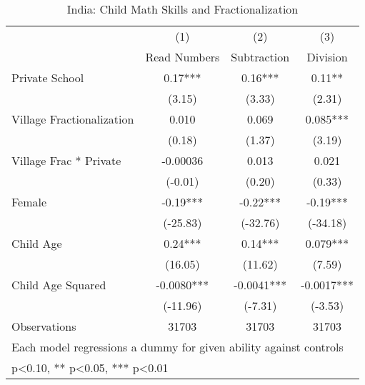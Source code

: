 \begin{table}[htbp]\centering
\def\sym#1{\ifmmode^{#1}\else\(^{#1}\)\fi}
\caption{India: Child Math Skills and Fractionalization\label{indiamath}}
\begin{tabular}{l*{3}{c}}
\toprule
                &\multicolumn{1}{c}{(1)}&\multicolumn{1}{c}{(2)}&\multicolumn{1}{c}{(3)}\\
                &\multicolumn{1}{c}{Read Numbers}&\multicolumn{1}{c}{Subtraction}&\multicolumn{1}{c}{Division}\\
\midrule
Private School  &     0.17***&     0.16***&     0.11** \\
                &   (3.15)   &   (3.33)   &   (2.31)   \\
Village Fractionalization&    0.010   &    0.069   &    0.085***\\
                &   (0.18)   &   (1.37)   &   (3.19)   \\
Village Frac * Private& -0.00036   &    0.013   &    0.021   \\
                &  (-0.01)   &   (0.20)   &   (0.33)   \\
Female          &    -0.19***&    -0.22***&    -0.19***\\
                & (-25.83)   & (-32.76)   & (-34.18)   \\
Child Age       &     0.24***&     0.14***&    0.079***\\
                &  (16.05)   &  (11.62)   &   (7.59)   \\
Child Age Squared&  -0.0080***&  -0.0041***&  -0.0017***\\
                & (-11.96)   &  (-7.31)   &  (-3.53)   \\
\midrule
Observations    &    31703   &    31703   &    31703   \\
\bottomrule
\multicolumn{4}{l}{\footnotesize Each model regressions a dummy for given ability against controls}\\
\multicolumn{4}{l}{\footnotesize * p<0.10, ** p<0.05, *** p<0.01}\\
\end{tabular}
\end{table}
